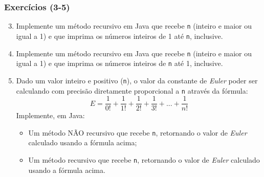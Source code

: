 \documentclass[xcolor={dvipsnames,table},aspectratio=169]{beamer}
\begin{document}
\begin{frame}\frametitle{Exercícios (3-5)}
\begin{enumerate}
        \setcounter{enumi}{2}
	\item Implemente um método recursivo em Java que recebe \texttt{n} (inteiro e maior ou igual a 1) e que imprima os números inteiros de 1 até \texttt{n}, inclusive.
	\item Implemente um método recursivo em Java que recebe \texttt{n} (inteiro e maior ou igual a 1) e que imprima os números inteiros de \texttt{n} até 1, inclusive.
	\item Dado um valor inteiro e positivo (\texttt{n}), o valor da constante de \emph{Euler} poder ser calculando com precisão diretamente proporcional a \texttt{n} através da fórmula:
\[ E = \frac{1}{0!} + \frac{1}{1!} + \frac{1}{2!}+ \frac{1}{3!} + ... + \frac{1}{n!}\]
Implemente, em Java:
\begin{itemize}
\item Um método NÃO recursivo que recebe \texttt{n}, retornando o valor de \emph{Euler} calculado usando a fórmula acima;
\item Um método recursivo que recebe \texttt{n}, retornando o valor de \emph{Euler} calculado usando a fórmula acima.
\end{itemize}
\end{enumerate}
\end{frame}
\end{document}
